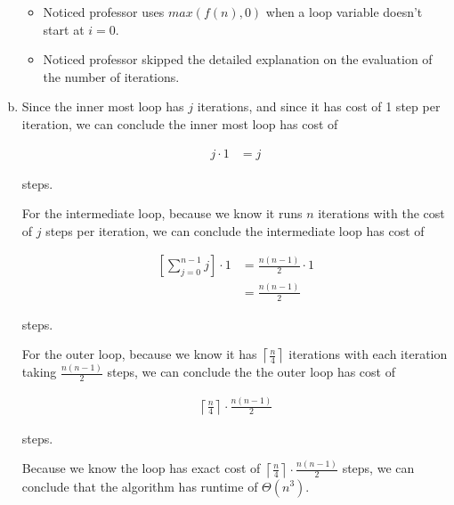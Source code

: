 \documentclass[12pt]{article}
\begin{document}
\begin{enumerate}[a.]
    \begin{itemize}
        \item Noticed professor uses $max(f(n),0)$ when a loop variable doesn't start
        at $i = 0$.

        \item Noticed professor skipped the detailed explanation on the evaluation of
        the number of iterations.

    \end{itemize}

    \item

    Since the inner most loop has $j$ iterations, and since it has cost of 1 step per
    iteration, we can conclude the inner most loop has cost of

    \setcounter{equation}{0}
    \begin{align}
        j \cdot 1 &= j
    \end{align}

    steps.

    \bigskip

    For the intermediate loop, because we know it runs $n$ iterations with the cost
    of $j$ steps per iteration, we can conclude the intermediate loop has cost
    of

    \begin{align}
        \left[ \sum\limits_{j=0}^{n-1} j \right] \cdot 1 &= \frac{n(n-1)}{2} \cdot 1\\
        &= \frac{n(n-1)}{2}
    \end{align}

    steps.

    \bigskip

    For the outer loop, because we know it has $\left\lceil \frac{n}{4} \right\rceil$ iterations
    with each iteration taking $\frac{n(n-1)}{2}$ steps, we can conclude the the outer
    loop has cost of

    \begin{align}
        \left\lceil \frac{n}{4} \right\rceil \cdot \frac{n(n-1)}{2}
    \end{align}

    steps.

    \bigskip

    Because we know the loop has exact cost of $\left\lceil \frac{n}{4}
    \right\rceil \cdot \frac{n(n-1)}{2}$ steps, we can conclude that the algorithm
    has runtime of $\Theta(n^3)$.

    \bigskip


\end{enumerate}
\end{document}
